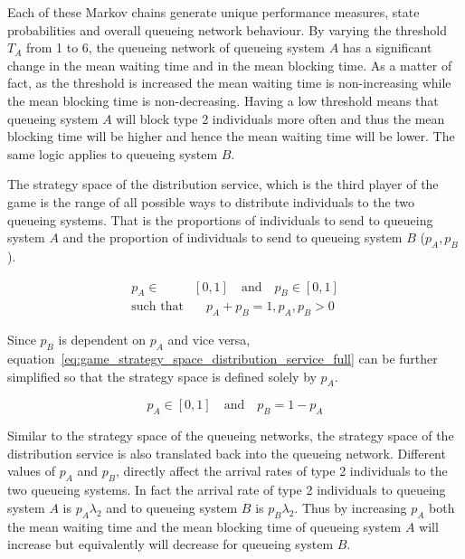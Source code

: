 Each of these Markov chains generate unique performance measures, state
probabilities and overall queueing network behaviour.
By varying the threshold \(T_A\) from 1 to 6, the queueing network of queueing
system \(A\) has a significant change in the mean waiting time and in the mean
blocking time.
As a matter of fact, as the threshold is increased the mean waiting time is
non-increasing while the mean blocking time is non-decreasing.
Having a low threshold means that queueing system \(A\) will block type 2
individuals more often and thus the mean blocking time will be higher and
hence the mean waiting time will be lower.
The same logic applies to queueing system \(B\).

The strategy space of the distribution service, which is the third player of the
game is the range of all possible ways to distribute individuals to the two
queueing systems.
That is the proportions of individuals to send to queueing system \(A\) and the
proportion of individuals to send to queueing system \(B\) (\(p_A, p_B\)).

\begin{align}
    p_A \in & [0, 1] \quad \text{and} \quad p_B \in [0, 1] \nonumber \\
    \text{such that} & \quad p_A + p_B = 1, p_A, p_B > 0
    \label{eq:game_strategy_space_distribution_service_full}
\end{align}

Since \(p_B\) is dependent on \(p_A\) and vice versa,
equation~\ref{eq:game_strategy_space_distribution_service_full} can be further
simplified so that the strategy space is defined solely by \(p_A\).

\begin{equation}\label{eq:game_strategy_space_distribution_service_simplified}
    p_A \in [0, 1] \quad \text{and} \quad p_B = 1 - p_A
\end{equation}

Similar to the strategy space of the queueing networks, the strategy space of
the distribution service is also translated back into the queueing network.
Different values of \(p_A\) and \(p_B\), directly affect the arrival rates of
type 2 individuals to the two queueing systems.
In fact the arrival rate of type 2 individuals to queueing system \(A\) is
\(p_A \lambda_2\) and to queueing system \(B\) is \(p_B \lambda_2\).
Thus by increasing \(p_A\) both the mean waiting time and the mean blocking time
of queueing system \(A\) will increase but equivalently will decrease for
queueing system \(B\).


